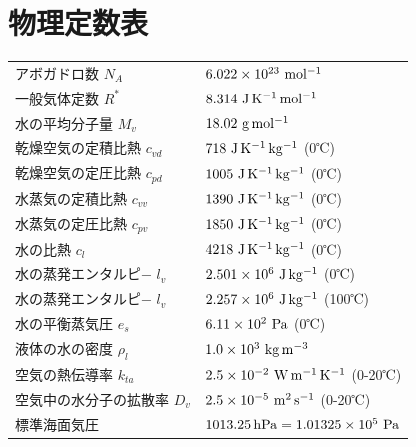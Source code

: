 \documentclass{jsarticle}
\begin{document}
\section{物理定数表}
\begin{table}[h]
 \begin{tabular}{ll}
 アボガドロ数 $N_{A}$ & $6.022 \times 10^{23} \ \rm{mol^{-1}}$ \\
 一般気体定数 $R^{*}$ & $8.314 \ \rm{J\,K^{-1}\,mol^{-1}}$ \\
 水の平均分子量 $M_{v}$ & $18.02 \ \rm{g\,mol^{-1}}$ \\ 
 乾燥空気の定積比熱 $c_{vd}$ & $718 \ \rm{J\,K^{-1}\,kg^{-1}}$ (0℃) \\ 
 乾燥空気の定圧比熱 $c_{pd}$ & $1005 \ \rm{J\,K^{-1}\,kg^{-1}}$ (0℃) \\
 水蒸気の定積比熱 $c_{vv}$ & $1390 \ \rm{J\,K^{-1}\,kg^{-1}}$ (0℃) \\ 
 水蒸気の定圧比熱 $c_{pv}$ & $1850 \ \rm{J\,K^{-1}\,kg^{-1}}$ (0℃) \\
 水の比熱 $c_{l}$ & $4218 \ \rm{J\,K^{-1}\,kg^{-1}}$ (0℃) \\
 水の蒸発エンタルピ− $l_{v}$ & $2.501 \times 10^{6} \ \rm{J \,kg^{-1}}$ (0℃) \\
 水の蒸発エンタルピ− $l_{v}$ & $2.257 \times 10^{6} \ \rm{J \,kg^{-1}}$ (100℃) \\
 水の平衡蒸気圧 $e_{s}$ & $6.11 \times 10^{2} \ \rm{Pa}$ (0℃) \\
 液体の水の密度 $\rho_{l}$ & $1.0 \times 10^{3} \ \rm{kg\,m^{-3}}$  \\
 空気の熱伝導率 $k_{ta}$ & $2.5 \times 10^{-2} \ \rm{W\,m^{-1}\,K^{-1}}$  (0-20℃)\\
 空気中の水分子の拡散率 $D_{v}$ & $2.5 \times 10^{-5} \ \rm{m^{2}\,s^{-1}}$  (0-20℃)\\
 標準海面気圧 & $1013.25\,\rm{hPa} = 1.01325 \times 10^{5}\ \rm{Pa}$
 \end{tabular}
\end{table}
\end{document}
